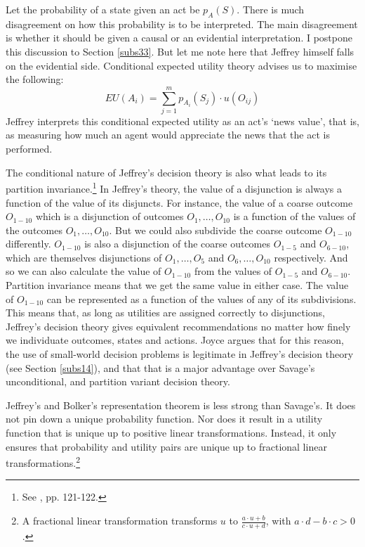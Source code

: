 Let the probability of a state given an act be $p_{A} (S)$. There is much disagreement on how this probability is to be interpreted. The main disagreement is whether it should be given a causal or an evidential interpretation. I postpone this discussion to Section \ref{subs33}. But let me note here that Jeffrey himself falls on the evidential side. Conditional expected utility theory advises us to maximise the following:
$$EU(A_{i}) = \sum\limits_{j=1}^m p_{A_i} (S_j) \cdot u (O_{ij})$$
Jeffrey interprets this conditional expected utility as an act's `news value', that is, as measuring how much an agent would appreciate the news that the act is performed.

The conditional nature of Jeffrey's decision theory is also what leads to its partition invariance.\footnote{See \citet{Joyce1999}, pp. 121-122.} In Jeffrey's theory, the value of a disjunction is always a function of the value of its disjuncts. For instance, the value of a coarse outcome $O_{1-10}$ which is a disjunction of outcomes $O_1,\ldots,O_{10}$ is a function of the values of the outcomes $O_1,\ldots, O_{10}$. But we could also subdivide the coarse outcome $O_{1-10}$ differently. $O_{1-10}$ is also a disjunction of the coarse outcomes $O_{1-5}$ and $O_{6-10}$, which are themselves disjunctions of $O_1,\ldots,O_5$ and $O_6,\ldots,O_{10}$ respectively. And so we can also calculate the value of $O_{1-10}$ from the values of $O_{1-5}$ and $O_{6-10}$. Partition invariance means that we get the same value in either case. The value of $O_{1-10}$ can be represented as a function of the values of any of its subdivisions. This means that, as long as utilities are assigned correctly to disjunctions, Jeffrey's decision theory gives equivalent recommendations no matter how finely we individuate outcomes, states and actions. Joyce argues that for this reason, the use of small-world decision problems is legitimate in Jeffrey's decision theory (see Section \ref{subs14}), and that that is a major advantage over Savage's unconditional, and partition variant decision theory.

Jeffrey's and Bolker's representation theorem is less strong than Savage's. It does not pin down a unique probability function. Nor does it result in a utility function that is unique up to positive linear transformations. Instead, it only ensures that probability and utility pairs are unique up to fractional linear transformations.\footnote{A fractional linear transformation transforms $u$ to $\frac{a \cdot u + b}{c \cdot u + d}$, with $a \cdot d - b \cdot c > 0$.}

